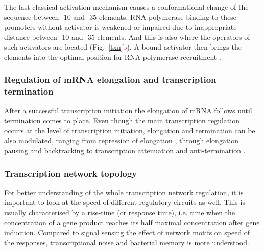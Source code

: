 The last classical activation mechanism causes a conformational change of the sequence between -10 and -35 elements.
RNA polymerase binding to these promoters without activator is weakened or impaired due to inappropriate distance between -10 and -35 elements.
And this is also where the operators of such activators are located (Fig.~\ref{txn}\textcolor{red}{b}).
A bound activator then brings the elements into the optimal position for RNA polymerase recruitment \cite{heldwein2001crystal}.


\subsubsection{Regulation of mRNA elongation and transcription termination}
After a successful transcription initiation the elongation of mRNA follows until termination comes to place.
Even though the main transcription regulation occurs at the level of transcription initiation, elongation and termination can be also modulated, ranging from repression of elongation \cite{monsalve1996protein}, through elongation pausing and backtracking \cite{mustaev2017transcription} to transcription attenuation and anti-termination \cite{naville2009transcription}.

\subsubsection{Transcription network topology}
For better understanding of the whole transcription network regulation, it is important to look at the speed of different regulatory circuits as well.
This is usually characterised by a rise-time (or response time), i.e. time when the concentration of a gene product reaches its half maximal concentration after gene induction.
Compared to signal sensing the effect of network motifs on speed of the responses, transcriptional noise and bacterial memory is more understood.


